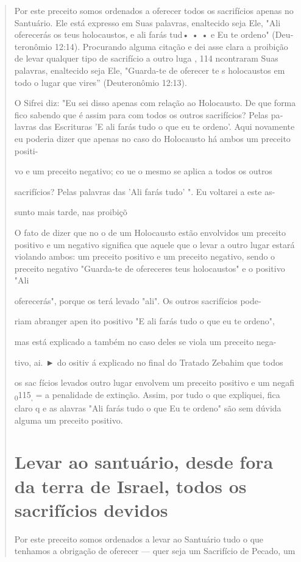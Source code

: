 \begin{quote}
Por este preceito somos ordenados a oferecer todos os sacrifícios apenas
no Santuário. Ele está expresso em Suas palavras, enaltecido seja Ele,
"Ali oferecerás os teus holocaustos, e ali farás tud• • • e Eu te
ordeno" (Deu­teronômio 12:14). Procurando alguma citação e dei asse
clara a proibição de levar qualquer tipo de sacrifício a outro luga ,
114 ncontraram Suas pala­vras, enaltecido seja Ele, "Guarda-te de
oferecer te s holocaustos em todo o lugar que vires'' (Deuteronômio
12:13).

O Sifrei diz: "Eu sei disso apenas com relação ao Holocausto. De que
forma fico sabendo que é assim para com todos os outros sacrifícios?
Pelas pa­lavras das Escrituras 'E ali farás tudo o que eu te ordeno'.
Aqui novamente eu poderia dizer que apenas no caso do Holocausto há
ambos um preceito positi-

vo e um preceito negativo; co ue o mesmo se aplica a todos os outros

sacrifícios? Pelas palavras das 'Ali farás tudo' ". Eu voltarei a este
as-

sunto mais tarde, nas proibiçõ

O fato de dizer que no o de um Holocausto estão envolvidos um preceito
positivo e um negativo significa que aquele que o levar a outro lugar
estará violando ambos: um preceito positivo e um preceito negativo,
sendo o preceito negativo "Guarda-te de ofereceres teus holocaustos" e o
positivo "Ali

oferecerás", porque os terá levado "ali". Os outros sacrifícios pode-

riam abranger apen ito positivo "E ali farás tudo o que eu te ordeno",

mas está explicado a também no caso deles se viola um preceito nega-

tivo, ai. ► do ositiv á explicado no final do Tratado
Zebahim que todos

os sac fícios levados outro lugar envolvem um preceito positivo e um
negafi \textsubscript{0}115\textsubscript{,} = a penalidade de extinção.
Assim, por tudo o que expliquei, fica claro q e as alavras "Ali farás
tudo o que Eu te ordeno" são sem dúvida algu­ma um preceito positivo.

\section{Levar ao santuário, desde fora da terra de Israel, todos os sacrifícios devidos}

Por este preceito somos ordenados a levar ao Santuário tudo o que
tenhamos a obrigação de oferecer --- quer seja um Sacrifício de Pecado,
um
\end{quote}

